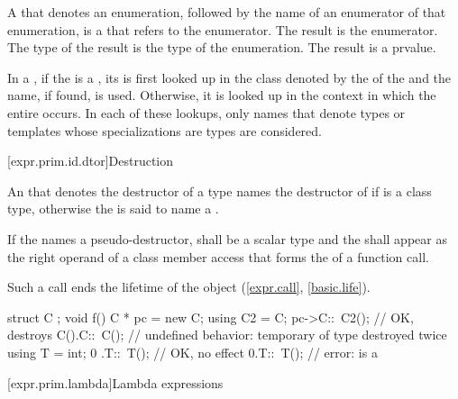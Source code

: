 \pnum
A  that denotes an
enumeration, followed by the name of an
enumerator of that enumeration, is a 
that refers to the enumerator. The result is the enumerator. The type
of the result is the type of the enumeration. The result is a prvalue.

\pnum
In a , if the
is a
, its 
is first looked up in the class denoted by
the  of the  and
the name, if found, is used.
Otherwise, it is looked up in the context in which
the entire  occurs.
In each of these lookups, only names that denote types or
templates whose specializations are types are considered.

[expr.prim.id.dtor]{Destruction}

\pnum
{}%
%
An  that denotes the destructor of a type 
names the destructor of 
if  is a class type,
otherwise the  is said
to name a .

\pnum
If the  names a pseudo-destructor,
 shall be a scalar type and
the  shall appear
as the right operand of a class member access that forms
the  of a function call.
\begin{note}
Such a call ends the lifetime of the object (\ref{expr.call}, \ref{basic.life}).
\end{note}

\pnum
\begin{example}
\begin{codeblock}
struct C { };
void f() {
  C * pc = new C;
  using C2 = C;
  pc->C::~C2();     // OK, destroys 
  C().C::~C();      // undefined behavior: temporary of type  destroyed twice
  using T = int;
  0 .T::~T();       // OK, no effect
  0.T::~T();        // error:  is a 
}
\end{codeblock}
\end{example}

[expr.prim.lambda]{Lambda expressions}%

